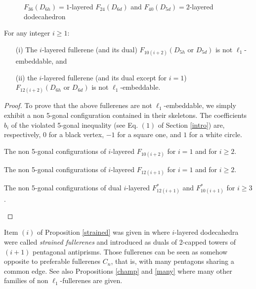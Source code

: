 \begin{figure}[htb]
\begin{center}
\caption{$F_{36}(D_{6h})=1$-layered $F_{24}(D_{6d})$ and $F_{40}(D_{5d})=2$-layered
dodecahedron}\label{F40}
\end{center}
\end{figure}
\begin{proposition}\label{strained} For any integer $i\geq 1$:
\begin{itemize} 
\item[(i)] The $i$-layered fullerene (and its dual) $F_{10(i+2)}(D_{5h}\mbox{ or }D_{5d})$  
is not $\ell_1$-embeddable, and
\item[(ii)] the $i$-layered fullerene (and its dual except for $i\!=\!1$) $F_{12(i+2)}(D_{6h}\mbox{ or }D_{6d})$
is not $\ell_1$-embeddable.
\end{itemize}
\begin{proof}
To prove that the above fullerenes are not $\ell_1$-embeddable, we simply exhibit a non 5-gonal
configuration contained in their skeletons. The coefficients $b_i$ of the violated 
5-gonal inequality (see Eq. $(1)$ of Section \ref{intro})
are, respectively, $0$ for a black vertex, $-1$ for a square one, and $1$ for a white circle.

\newpage
\begin{center}

The non 5-gonal configurations of $i$-layered $F_{10(i+2)}$ for $i=1$ and for $i\geq 2$. 
\end{center}

\begin{center}

The non 5-gonal configurations of $i$-layered $F_{12(i+1)}$ for $i=1$ and for $i\geq 2$.
\end{center}

\begin{center}

The non 5-gonal configurations of dual $i$-layered $F^*_{12(i+1)}$ and $F^*_{10(i+1)}$
for $i\geq 3$.
\end{center}
\end{proof}
\end{proposition}

Item $(i)$ of Proposition \ref{strained} was given in \cite{dg96} where $i$-layered
dodecahedra were called {\it strained fullerenes} and introduced as duals of 2-capped towers
of $(i+1)$ pentagonal antiprisms. Those fullerenes can be seen as somehow 
opposite to preferable fullerenes $C_n$, that is, with many pentagons sharing a common
edge. See also Propositions \ref{champ} and \ref{many} where many other families of non
$\ell_1$-fullerenes are given.

